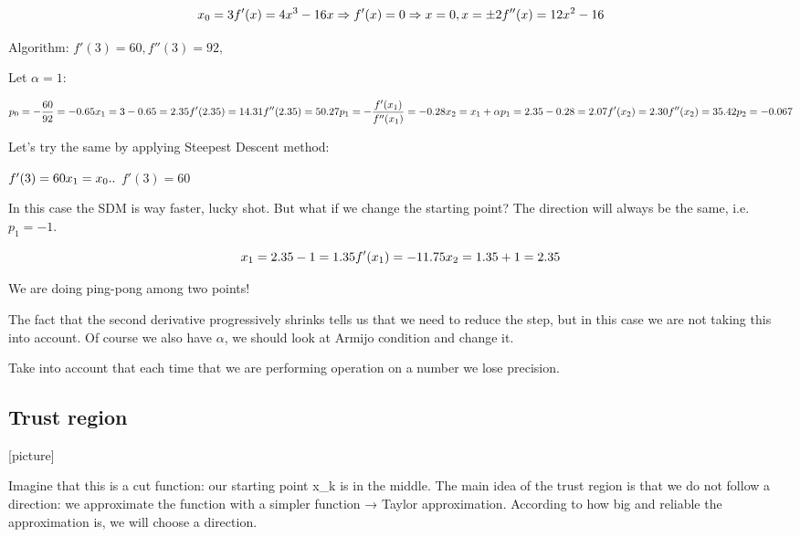 $$
x_0=3 \\ f'(x) = 4x^3-16x \Rightarrow f'(x)=0 \Rightarrow  x=0, x=\pm 2\\ f''(x)=12x^2-16
$$

Algorithm: $f'(3)=60, f''(3)=92,$

Let $\alpha=1$:

$$
p_0= -\frac{60}{92}=-0.65 \\ x_1=3-0.65=2.35 \\ f'(2.35) = 14.31\\ f''(2.35) = 50.27 \\ p_1=-\frac{f'(x_1)}{f''(x_1)} = -0.28\\ x_2=x_1+\alpha p_1 = 2.35-0.28=2.07 \\ f'(x_2) = 2.30 \\ f''(x_2)=35.42\\ p_2 = -0.067
$$

Let's try the same by applying Steepest Descent method:

$f'(3)=60 \\ x_1 = x_0..$
$f'(3)=60$

In this case the SDM is way faster, lucky shot. But what if we change
the starting point? The direction will always be the same,
i.e.~$p_1 = -1$.

$$
x_1=2.35-1=1.35\\f'(x_1)=-11.75\\x_2=1.35+1 = 2.35 
$$

We are doing ping-pong among two points!

The fact that the second derivative progressively shrinks tells us that
we need to reduce the step, but in this case we are not taking this into
account. Of course we also have $\alpha$, we should look at Armijo
condition and change it.

Take into account that each time that we are performing operation on a
number we lose precision.

\hypertarget{trust-region}{%
\subsection{Trust region}\label{trust-region}}

{[}picture{]}

Imagine that this is a cut function: our starting point x\_k is in the
middle. The main idea of the trust region is that we do not follow a
direction: we approximate the function with a simpler function → Taylor
approximation. According to how big and reliable the approximation is,
we will choose a direction.


